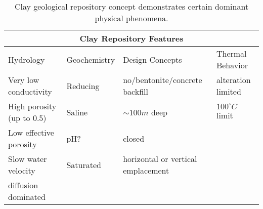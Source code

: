 %
\begin{table}[h!]
  \centering
  \footnotesize{
  \begin{tabular}{|l|l|l|l|}
    \multicolumn{4}{c}{\textbf{Clay Repository Features}}\\
    \hline
     Hydrology & Geochemistry & Design Concepts & Thermal Behavior \\ 
    \hline
    Very low conductivity&Reducing&no/bentonite/concrete backfill &alteration limited\\
    High porosity (up to 0.5)&Saline&$\sim100m$ deep&$100^\circ C$ limit \\
    Low effective porosity&pH?&closed&\\
    Slow water velocity &Saturated&horizontal or vertical emplacement&\\
    diffusion dominated &&&\\
    \hline
  \end{tabular}
  \caption[Clay Repository Features]{Clay geological repository 
  concept demonstrates certain dominant physical phenomena. }
  \label{tab:clay_tab}
  }
\end{table}


